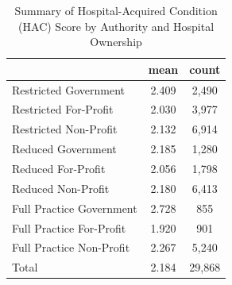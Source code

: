 \begin{table}[htbp]\centering
\def\sym#1{\ifmmode^{#1}\else\(^{#1}\)\fi}
\caption{Summary of Hospital-Acquired Condition (HAC) Score by Authority and Hospital Ownership}
\begin{tabular}{l*{1}{cc}}
\toprule
                    &        mean&       count\\
\midrule
Restricted Government&       2.409&       2,490\\
Restricted For-Profit&       2.030&       3,977\\
Restricted Non-Profit&       2.132&       6,914\\
Reduced Government  &       2.185&       1,280\\
Reduced For-Profit  &       2.056&       1,798\\
Reduced Non-Profit  &       2.180&       6,413\\
Full Practice Government&       2.728&         855\\
Full Practice For-Profit&       1.920&         901\\
Full Practice Non-Profit&       2.267&       5,240\\
Total               &       2.184&      29,868\\
\bottomrule
\end{tabular}
\end{table}
